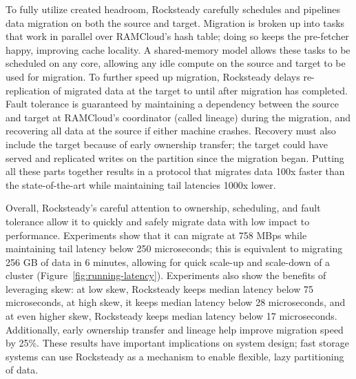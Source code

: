 To fully utilize created headroom, Rocksteady carefully schedules and
pipelines data migration on both the source and target.
%
Migration is
broken up into tasks that work in parallel over RAMCloud’s hash table;
doing so keeps the pre-fetcher happy, improving cache locality.
%
A shared-memory model allows these tasks to be scheduled on any core,
allowing any idle compute on the source and target to be used for
migration.
%
To further speed up migration, Rocksteady delays
re-replication of migrated data at the target to until after migration
has completed.
%
Fault tolerance is guaranteed by maintaining a dependency
between the source and target at RAMCloud’s coordinator (called lineage)
during the migration, and recovering all data at the source if either
machine crashes.
%
Recovery must also include the target because of early
ownership transfer; the target could have served and replicated writes
on the partition since the migration began.
%
Putting all these parts
together results in a protocol that migrates data 100x faster than the
state-of-the-art while maintaining tail latencies 1000x lower.



Overall, Rocksteady’s careful attention to ownership, scheduling, and
fault tolerance allow it to quickly and safely migrate data with low
impact to performance.
%
Experiments show that it can migrate at 758 MBps
while maintaining tail latency below 250 microseconds; this is
equivalent to migrating 256 GB of data in 6 minutes, allowing for quick
scale-up and scale-down of a cluster (Figure~\ref{fig:running-latency}).
%
Experiments also show the benefits
of leveraging skew: at low skew, Rocksteady keeps median latency below
75 microseconds, at high skew, it keeps median latency below 28
microseconds, and at even higher skew, Rocksteady keeps median latency
below 17 microseconds.
%
Additionally, early ownership transfer and
lineage help improve migration speed by 25\%.
%
These results have
important implications on system design; fast storage systems can use
Rocksteady as a mechanism to enable flexible, lazy partitioning of
data.
